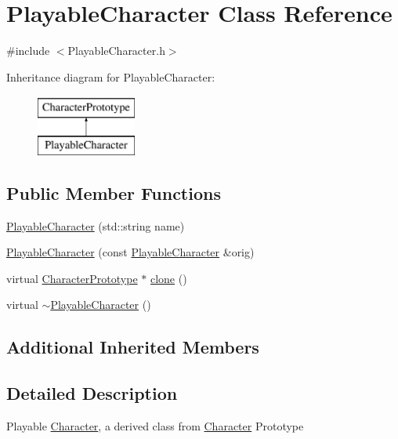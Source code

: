 \hypertarget{classPlayableCharacter}{}\section{Playable\+Character Class Reference}
\label{classPlayableCharacter}


{\ttfamily \#include $<$Playable\+Character.\+h$>$}

Inheritance diagram for Playable\+Character\+:\begin{figure}[H]
\begin{center}
\leavevmode
\includegraphics[height=2.000000cm]{classPlayableCharacter}
\end{center}
\end{figure}
\subsection*{Public Member Functions}
\begin{DoxyCompactItemize}
\item 
\hyperlink{classPlayableCharacter_a2c03ac78c7f71376ba874026693122c9}{Playable\+Character} (std\+::string name)
\item 
\hyperlink{classPlayableCharacter_afea57d110e99ca826e37e077f2787fa2}{Playable\+Character} (const \hyperlink{classPlayableCharacter}{Playable\+Character} \&orig)
\item 
virtual \hyperlink{classCharacterPrototype}{Character\+Prototype} $\ast$ \hyperlink{classPlayableCharacter_aadde0d9220aa0dd78b51bbbe87ecd628}{clone} ()
\item 
virtual \hyperlink{classPlayableCharacter_aa738dea6ac366827ca4a7f6ad406bba2}{$\sim$\+Playable\+Character} ()
\end{DoxyCompactItemize}
\subsection*{Additional Inherited Members}


\subsection{Detailed Description}
Playable \hyperlink{classCharacter}{Character}, a derived class from \hyperlink{classCharacter}{Character} Prototype 

